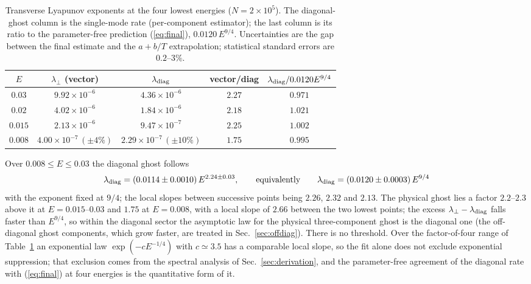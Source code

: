 \documentclass[11pt,a4paper]{article}
\begin{document}
\begin{table}
\centering
\caption{Transverse Lyapunov exponents at the four lowest energies ($N=2\times10^5$). The
diagonal-ghost column is the single-mode rate (per-component estimator); the last column is its
ratio to the parameter-free prediction (\ref{eq:final}), $0.0120\,E^{9/4}$. Uncertainties are
the gap between the final estimate and the $a+b/T$ extrapolation; statistical standard errors
are $0.2$--$3\%$.}
\label{tab:low}
\begin{tabular}{ccccc}
\toprule
$E$ & $\lambda_\perp$ (vector) & $\lambda_{\rm diag}$ & vector/diag & $\lambda_{\rm diag}/0.0120E^{9/4}$\\
\midrule
$0.03$  & $9.92\times10^{-6}$ & $4.36\times10^{-6}$ & $2.27$ & $0.971$\\
$0.02$  & $4.02\times10^{-6}$ & $1.84\times10^{-6}$ & $2.18$ & $1.021$\\
$0.015$ & $2.13\times10^{-6}$ & $9.47\times10^{-7}$ & $2.25$ & $1.002$\\
$0.008$ & $4.00\times10^{-7}\,(\pm4\%)$ & $2.29\times10^{-7}\,(\pm10\%)$ & $1.75$ & $0.995$\\
\bottomrule
\end{tabular}
\end{table}

Over $0.008\le E\le0.03$ the diagonal ghost follows
\begin{equation}
\lambda_{\rm diag}=(0.0114\pm0.0010)\,E^{2.24\pm0.03},
\qquad\text{equivalently}\qquad
\lambda_{\rm diag}=(0.0120\pm0.0003)\,E^{9/4}
\label{eq:fit}
\end{equation}
with the exponent fixed at $9/4$; the local slopes between successive points being $2.26$, $2.32$ and $2.13$. The physical ghost
lies a factor $2.2$--$2.3$ above it at $E=0.015$--$0.03$ and $1.75$ at $E=0.008$, with a local
slope of $2.66$ between the two lowest points; the excess $\lambda_\perp-\lambda_{\rm diag}$
falls faster than $E^{9/4}$, so within the diagonal sector the asymptotic law for the physical
three-component ghost is the diagonal one (the off-diagonal ghost components, which grow faster,
are treated in Sec.~\ref{sec:offdiag}). There is no threshold. Over the factor-of-four range of Table~\ref{tab:low} an exponential law
$\exp(-cE^{-1/4})$ with $c\simeq3.5$ has a comparable local slope, so the fit alone does not
exclude exponential suppression; that exclusion comes from the spectral analysis of
Sec.~\ref{sec:derivation}, and the parameter-free agreement of the diagonal rate with
(\ref{eq:final}) at four energies is the quantitative form of it.
\end{document}
